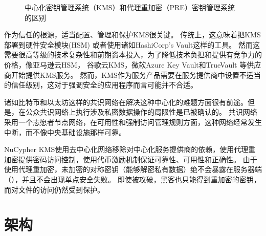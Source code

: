 \documentclass[longbibliography,nofootinbib]{revtex4-1}
\newcommand{\kms}{NuCypher KMS}
\begin{document}
\begin{figure}
    \centering
    \qquad
    \qquad
    \caption{中心化密钥管理系统（KMS）和代理重加密（PRE）密钥管理系统的区别}
    \label{fig:kms}
\end{figure}

作为信任的根源，适当配置、管理和保护KMS很关键。
传统上，这意味着把KMS部署到硬件安全模块(HSM)\cite{wiki:hsm} 或者使用诸如HashiCorp's Vault\cite{web:hashicorp-vault}这样的工具。
然而这需要很高等级的技术复杂性和前期资本投入，为了降低技术负担和提供有竞争力的价格，像亚马逊云HSM\cite{web:aws-cloudhsm}，
谷歌云KMS\cite{web:google-cloud-kms}，微软Azure Key Vault\cite{web:azure-key-vault}和TrueVault\cite{web:truevault} 等供应商开始提供KMS服务。
然而，KMS作为服务产品需要在服务提供商中设置不适当的信任级别，这对于强调安全的应用程序而言可能并不合适。

诸如比特币和以太坊这样的共识网络在解决这种中心化的难题方面很有前途。但是，在公众共识网络上执行涉及私密数据操作的局限性是已被确认的\cite{cryptoeprint:2017:201}。
共识网络采用一个志愿者节点网络，在可用性和强制访问管理规则方面，这种网络经常发生中断，而不像中央基础设施那样可靠。

\kms 使用去中心化网络移除对中心化服务提供商的依赖，使用代理重加密提供密码访问控制，使用代币激励机制保证可靠性、可用性和正确性。
由于使用代理重加密，未加密的对称密钥（能够解密私有数据）绝不会暴露在服务器端（），并且不会出现单点安全失败。
即使被攻破，黑客也只能得到重加密的密钥，而对文件的访问仍然受到保护。

\section{架构}
\end{document}
